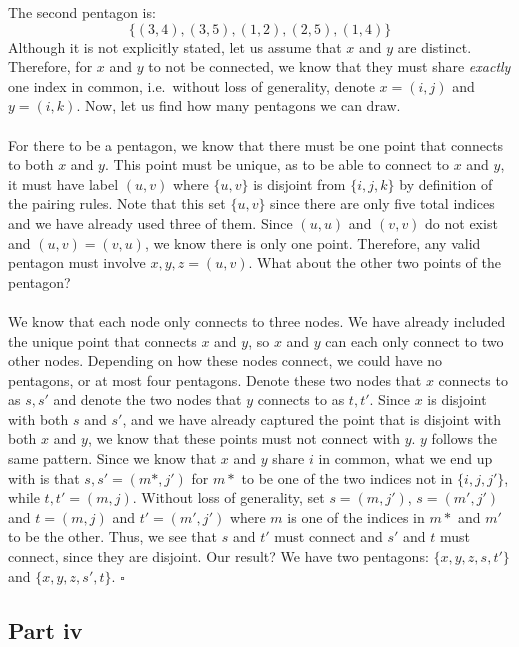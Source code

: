 \documentclass[letterpaper]{article}
\newcommand*{\QED}{\hfill\ensuremath{\square}}%
\begin{document}
The second pentagon is:
\[
\{ (3,4), (3,5), (1,2), (2,5), (1,4) \}
\]
Although it is not explicitly stated, let us assume that $ x $ and $ y $ are distinct.
Therefore, for $ x $ and $ y $ to not be connected, we know that they must share \textit{exactly} one index in common, i.e.\ without loss of generality, denote $ x = (i, j) $ and $ y = (i, k) $.
Now, let us find how many pentagons we can draw.
\\ \\
For there to be a pentagon, we know that there must be one point that connects to both $ x $ and $ y $.
This point must be unique, as to be able to connect to $ x $ and $ y $, it must have label $ (u, v) $ where $ \{u, v\} $ is disjoint from $ \{i, j, k\} $ by definition of the pairing rules.
Note that this set $ \{u, v\} $ since there are only five total indices and we have already used three of them.
Since $ (u, u) $ and $ (v,v) $ do not exist and $(u, v) = (v, u) $, we know there is only one point.
Therefore, any valid pentagon must involve $ x, y, z = (u,v) $.
What about the other two points of the pentagon?
\\ \\
We know that each node only connects to three nodes.
We have already included the unique point that connects $ x $ and $ y $, so $ x $ and $ y $ can each only connect to two other nodes.
Depending on how these nodes connect, we could have no pentagons, or at most four pentagons.
Denote these two nodes that $ x $ connects to as $ s, s' $ and denote the two nodes that $ y $ connects to as $ t, t' $.
Since $ x $ is disjoint with both $ s $ and $ s' $, and we have already captured the point that is disjoint with both $ x $ and $ y $, we know that these points must not connect with $ y $.
$ y $ follows the same pattern.
Since we know that $ x $ and $ y $ share $ i $ in common, what we end up with is that $ s, s' = (m*, j') $ for $ m* $ to be one of the two indices not in $ \{i, j, j'\} $, while $ t, t' = (m, j) $.
Without loss of generality, set $ s = (m, j') $, $ s = (m', j') $ and $ t = (m, j) $ and $ t' = (m', j') $ where $ m $ is one of the indices in $ m* $ and $ m' $ to be the other.
Thus, we see that $ s $ and $ t' $ must connect and $ s' $ and $ t $ must connect, since they are disjoint.
Our result?
We have two pentagons: $ \{x, y, z, s, t'\} $ and $ \{x, y, z, s', t\} $.
\QED{}

\subsection{Part iv}
\label{subs:2Partiv}
\end{document}
